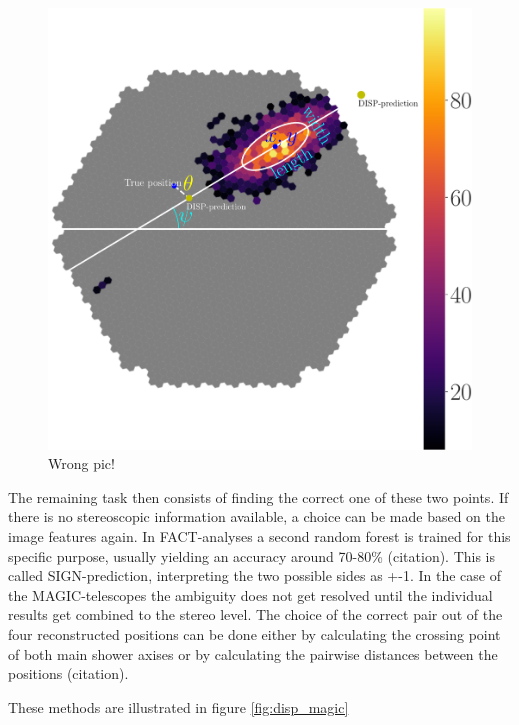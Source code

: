 \begin{figure}
    \includegraphics[width=0.9\linewidth]{Plots/hillas_complete.pdf}
    \caption{Wrong pic!}
    \label{fig:disp_amb}
\end{figure}


The remaining task then consists of finding the correct one of these
two points. If there is no stereoscopic information available,
a choice can be made based on the image features again.
In FACT-analyses a second random forest is trained for this
specific purpose, usually yielding an accuracy around 70-80\% (citation).
This is called SIGN-prediction, interpreting the two possible sides
as +-1.
In the case of the MAGIC-telescopes the ambiguity does not
get resolved until the individual results get combined
to the stereo level. The choice of the correct
pair out of the four reconstructed positions can be done either
by calculating the crossing point of both main shower axises
or by calculating the pairwise distances between the positions (citation).


These methods are illustrated in figure \ref{fig:disp_magic}


